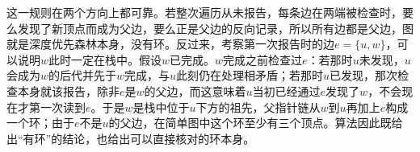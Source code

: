 这一规则在两个方向上都可靠。若整次遍历从未报告，每条边在两端被检查时，要么发现了新顶点而成为父边，要么正是父边的反向记录，所以所有边都是父边，图就是深度优先森林本身，没有环。反过来，考察第一次报告时的边$e=\{u,w\}$，可以说明$w$此时一定在栈中。假设$w$已完成。$w$完成之前检查过$e$：若那时$u$未发现，$u$会成为$w$的后代并先于$w$完成，与$u$此刻仍在处理相矛盾；若那时$u$已发现，那次检查本身就该报告，除非$e$是$w$的父边，而这意味着$u$当初已经通过$e$发现了$w$，不会现在才第一次读到$e$。于是$w$是栈中位于$u$下方的祖先，父指针链从$w$到$u$再加上$e$构成一个环；由于$e$不是$u$的父边，在简单图中这个环至少有三个顶点。算法因此既给出“有环”的结论，也给出可以直接核对的环本身。
